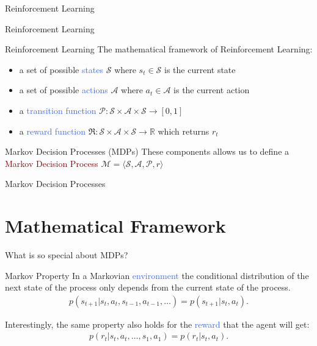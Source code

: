 \documentclass{beamer}
\begin{document}
\begin{frame}{Reinforcement Learning}
	
\end{frame}

\begin{frame}{Reinforcement Learning}
\end{frame}


\begin{frame}{Reinforcement Learning}
	The mathematical framework of Reinforcement Learning:
	\begin{itemize}
		\item a set of possible \textcolor{RoyalBlue}{states} $\mathcal{S}$ where $s_t\in\mathcal{S}$ is the current state
		\item a set of possible \textcolor{RoyalBlue}{actions} $\mathcal{A}$ where $a_t\in\mathcal{A}$ is the current action
		\item a \textcolor{RoyalBlue}{transition function} $\mathcal{P}:\mathcal{S}\times\mathcal{A}\times\mathcal{S}\rightarrow[0,1]$
		\item a \textcolor{RoyalBlue}{reward function} $\Re:\mathcal{S}\times\mathcal{A}\times\mathcal{S}\rightarrow \mathbb{R}$ which returns $r_t$
	\end{itemize}

	\begin{block}{Markov Decision Processes (MDPs)}
		These components allows us to define a \textcolor{Maroon}{Markov Decision Process} 
		\centering $\mathcal{M}=\langle \mathcal{S},\mathcal{A},\mathcal{P},r\rangle$
	\end{block}

\end{frame}



\begin{frame}{Markov Decision Processes}
	\section{Mathematical Framework}
	What is so special about MDPs?
	\begin{block}{Markov Property}
		In a Markovian \textcolor{RoyalBlue}{environment} the conditional distribution of the next state of the process only depends from the current state of the process. 		\centering  	
		\begin{align*}
		p(s_{t+1}|s_t, a_t, s_{t-1}, a_{t-1}, \ldots) = p(s_{t+1} | s_t, a_t).
		\end{align*}
	\end{block}

	Interestingly, the same property also holds for the \textcolor{RoyalBlue}{reward} that the agent will get: 
	\begin{align*}
			p(r_t| s_t, a_t, \ldots, s_1, a_1) = p(r_t|s_t,a_t).
	\end{align*}
\end{frame}
\end{document}
